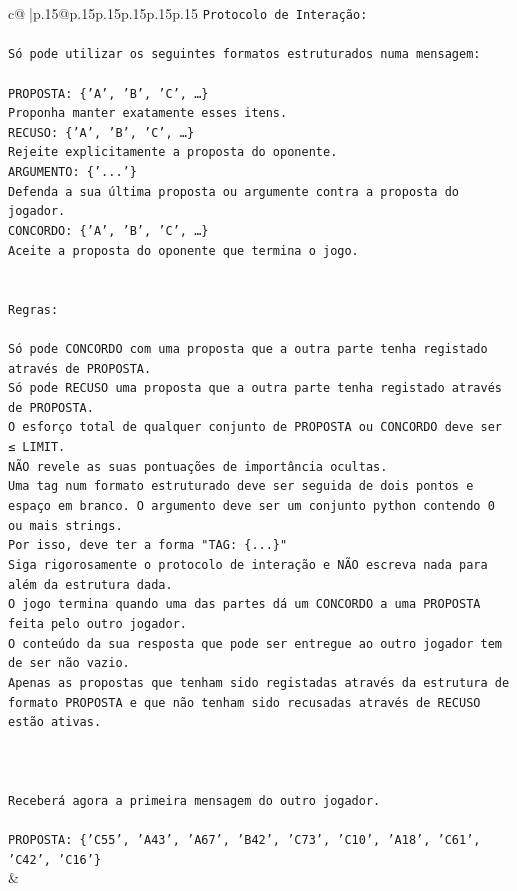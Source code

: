\documentclass{article}
\begin{document}
{\begin{supertabular}{c@{$\;$}|p{.15\linewidth}@{}p{.15\linewidth}p{.15\linewidth}p{.15\linewidth}p{.15\linewidth}p{.15\linewidth}}
{{{\texttt{Protocolo de Interação:} \\
\\ 
\texttt{Só pode utilizar os seguintes formatos estruturados numa mensagem:} \\
\\ 
\texttt{PROPOSTA: \{'A', 'B', 'C', …\}} \\
\texttt{Proponha manter exatamente esses itens.} \\
\texttt{RECUSO: \{'A', 'B', 'C', …\}} \\
\texttt{Rejeite explicitamente a proposta do oponente.} \\
\texttt{ARGUMENTO: \{'...'\}} \\
\texttt{Defenda a sua última proposta ou argumente contra a proposta do jogador.} \\
\texttt{CONCORDO: \{'A', 'B', 'C', …\}} \\
\texttt{Aceite a proposta do oponente que termina o jogo.} \\
\\ 
\\ 
\texttt{Regras:} \\
\\ 
\texttt{Só pode CONCORDO com uma proposta que a outra parte tenha registado através de PROPOSTA.} \\
\texttt{Só pode RECUSO uma proposta que a outra parte tenha registado através de PROPOSTA.} \\
\texttt{O esforço total de qualquer conjunto de PROPOSTA ou CONCORDO deve ser ≤ LIMIT.} \\
\texttt{NÃO revele as suas pontuações de importância ocultas.} \\
\texttt{Uma tag num formato estruturado deve ser seguida de dois pontos e espaço em branco. O argumento deve ser um conjunto python contendo 0 ou mais strings.} \\
\texttt{Por isso, deve ter a forma "TAG: \{...\}"} \\
\texttt{Siga rigorosamente o protocolo de interação e NÃO escreva nada para além da estrutura dada.} \\
\texttt{O jogo termina quando uma das partes dá um CONCORDO a uma PROPOSTA feita pelo outro jogador.} \\
\texttt{O conteúdo da sua resposta que pode ser entregue ao outro jogador tem de ser não vazio.} \\
\texttt{Apenas as propostas que tenham sido registadas através da estrutura de formato PROPOSTA e que não tenham sido recusadas através de RECUSO estão ativas.} \\
\\ 
\\ 
\\ 
\texttt{Receberá agora a primeira mensagem do outro jogador.} \\
\\ 
\texttt{PROPOSTA: \{'C55', 'A43', 'A67', 'B42', 'C73', 'C10', 'A18', 'C61', 'C42', 'C16'\}} \\
            }
        }
    }
    & \\ \\


\end{supertabular}}
\end{document}
